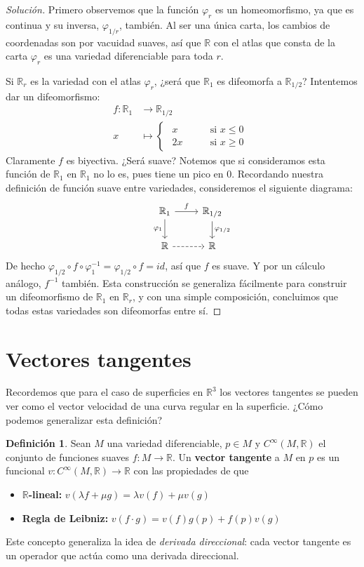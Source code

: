 \documentclass[spanish]{book}
\theoremstyle{definition}
\newtheorem*{defn}{Definición}
\newcommand{\R}{\mathbb{R}}
\begin{document}
	\begin{proof}[Solución]
		Primero observemos que la función $\varphi_r$ es un homeomorfismo, ya que es continua y su inversa, $\varphi_{1/r}$, también. Al ser una única carta, los cambios de coordenadas son por vacuidad suaves, así que $\R$ con el atlas que consta de la carta $\varphi_r$ es una variedad diferenciable para toda $r$.
		
		Si $\R_r$ es la variedad con el atlas $\varphi_r$, ¿será que $\R_1$ es difeomorfa a $\R_{1/2}$? Intentemos dar un difeomorfismo:
		\begin{align*}
			f:\R_1&\to\R_{1/2}\\
			x&\mapsto\begin{cases}
				\begin{aligned}
					x\qquad&\text{si }x\leq0\\
					2x\qquad&\text{si }x\geq0
				\end{aligned}
			\end{cases}
		\end{align*}
		Claramente $f$ es biyectiva. ¿Será suave? Notemos que si consideramos esta función de $\R_1$ en $\R_1$ no lo es, pues tiene un pico en 0. Recordando nuestra definición de función suave entre variedades, consideremos el siguiente diagrama:
		\[\begin{tikzcd}
			&\R_1\arrow{r}{f}\arrow[swap]{d}{\varphi_1}&\R_{1/2}\arrow{d}{\varphi_{1/2}}\\
			&\R\arrow[dashed]{r}&\R
		\end{tikzcd}\]
		De hecho $\varphi_{1/2}\circ f\circ\varphi^{-1}_1=\varphi_{1/2}\circ f=id$, así que $f$ es suave. Y por un cálculo análogo, $f^{-1}$ también. Esta construcción se generaliza fácilmente para construir un difeomorfismo de $\R_1$ en $\R_r$, y con una simple composición, concluimos que todas estas variedades son difeomorfas entre sí.
	\end{proof}
	
	\section{Vectores tangentes}
	Recordemos que para el caso de superficies en $\R^3$ los vectores tangentes se pueden ver como el vector velocidad de una curva regular en la superficie. ¿Cómo podemos generalizar esta definición?
	\begin{defn}
		Sean $M$ una variedad diferenciable, $p\in M$ y $C^\infty(M,\R)$ el conjunto de funciones suaves $f:M\to\R$. Un \textbf{vector tangente} a $M$ en $p$ es un funcional $v:C^\infty(M,\R)\to\R$ con las propiedades de que
		\begin{itemize}
			\item \textbf{$\R$-lineal:} $v(\lambda f+\mu g)=\lambda v(f)+\mu v(g)$
			\item \textbf{Regla de Leibniz:} $v(f\cdot g)=v(f)g(p)+f(p)v(g)$
		\end{itemize}
	\end{defn}
	Este concepto generaliza la idea de \textit{derivada direccional}: cada vector tangente es un operador que actúa como una derivada direccional.
	
\end{document}
